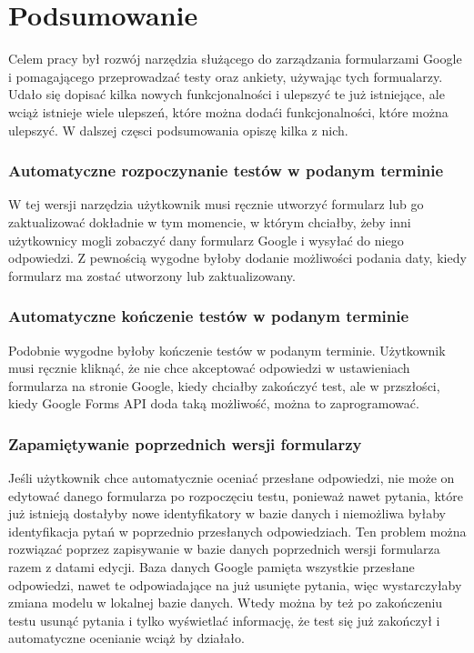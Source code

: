 \chapter{Podsumowanie}
Celem pracy był rozwój narzędzia służącego do zarządzania formularzami \mbox{Google}
i pomagającego
przeprowadzać testy oraz ankiety, używając tych formualarzy. Udało się dopisać kilka 
nowych funkcjonalności
i ulepszyć te już istniejące, ale wciąż istnieje wiele ulepszeń, które można dodaći funkcjonalności,
które można ulepszyć. W dalszej częsci podsumowania opiszę kilka z nich.

\subsection*{Automatyczne rozpoczynanie testów w podanym terminie}
W tej wersji narzędzia użytkownik musi ręcznie utworzyć formularz lub go zaktualizować dokładnie 
w tym momencie, w którym chciałby, żeby inni użytkownicy mogli zobaczyć dany formularz Google 
i wysyłać do niego odpowiedzi. Z pewnością wygodne byłoby dodanie możliwości podania daty, kiedy 
formularz ma zostać utworzony lub zaktualizowany.

\subsection*{Automatyczne kończenie testów w podanym terminie}
Podobnie wygodne byłoby kończenie testów w podanym terminie. Użytkownik musi ręcznie
kliknąć, że nie chce akceptować odpowiedzi w ustawieniach formularza na stronie Google,
kiedy chciałby zakończyć test, ale w przszłości, kiedy Google Forms API doda taką możliwość,
można to zaprogramować.

\subsection*{Zapamiętywanie poprzednich wersji formularzy}

Jeśli użytkownik chce automatycznie oceniać przesłane
odpowiedzi, nie może on edytować danego formularza po rozpoczęciu testu, ponieważ nawet pytania, 
które już istnieją
dostałyby nowe identyfikatory w bazie danych i niemożliwa byłaby identyfikacja pytań w poprzednio 
przesłanych odpowiedziach. Ten problem można rozwiązać poprzez zapisywanie w bazie danych poprzednich
wersji formularza razem z datami edycji. Baza danych Google pamięta wszystkie przesłane odpowiedzi,
nawet te odpowiadające na już usunięte pytania, więc wystarczyłaby zmiana modelu w lokalnej bazie 
danych. Wtedy można by też po zakończeniu testu usunąć pytania 
i tylko wyświetlać informację, że test się już zakończył i automatyczne ocenianie wciąż by działało.

